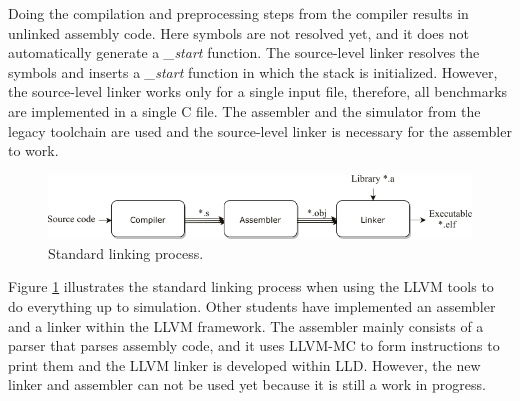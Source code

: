 Doing the compilation and preprocessing steps from the compiler results in unlinked assembly code. Here symbols are not resolved yet, and it does not automatically generate a \emph{\_start} function. The source-level linker resolves the symbols and inserts a \emph{\_start} function in which the stack is initialized. However, the source-level linker works only for a single input file, therefore, all benchmarks are implemented in a single C file. The assembler and the simulator from the legacy toolchain are used and the source-level linker is necessary for the assembler to work. 

\begin{figure}[t]
\centering
\includegraphics[width=.9\textwidth]{figures/linker_illustration2}
\caption{Standard linking process.}
\label{fig:linker_B}
\end{figure}

Figure \ref{fig:linker_B} illustrates the standard linking process when using the LLVM tools to do everything up to simulation. Other students have implemented an assembler and a linker within the LLVM framework. The assembler mainly consists of a parser that parses assembly code, and it uses LLVM-MC to form instructions to print them and the LLVM linker is developed within LLD. However, the new linker and assembler can not be used yet because it is still a work in progress.









